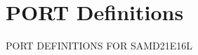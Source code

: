 \hypertarget{group___s_a_m_d21_e16_l__port}{}\section{P\+O\+RT Definitions}
\label{group___s_a_m_d21_e16_l__port}
P\+O\+RT D\+E\+F\+I\+N\+I\+T\+I\+O\+NS F\+OR S\+A\+M\+D21\+E16L 